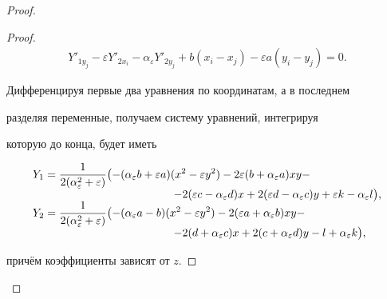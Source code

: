 \begin{proof}
\begin{proof}
\begin{equation*}
\begin{array}{l}
Y'_{1y_j} - \varepsilon Y'_{2x_i} - \alpha_{\varepsilon}Y'_{2y_j}

+ b(x_i - x_j) - \varepsilon a(y_i-y_j) = 0.

\end{array}\end{equation*}

Дифференцируя первые два уравнения по координатам, а в последнем

разделяя переменные, получаем систему уравнений, интегрируя

которую до конца, будет иметь

\begin{equation}

\label{kyrov:3.14}

\begin{array}{l}

\displaystyle

Y_1  = \frac{1}{2(\alpha_{\varepsilon}^2 + \varepsilon)}

\bigl(-(\alpha_{\varepsilon}b+\varepsilon a)(x^2 -

\varepsilon y^2) - 2\varepsilon(b+\alpha_{\varepsilon}a)xy

-\\

\hspace{4.45cm}

-2(\varepsilon c - \alpha_{\varepsilon}d)x  + 2(\varepsilon d -

\alpha_{\varepsilon}c)y + \varepsilon k - \alpha_{\varepsilon}l\bigr),

\\ 

\displaystyle

Y_2  = \frac{1}{2(\alpha_{\varepsilon}^2 +

\varepsilon)} \bigl(-(\alpha_{\varepsilon}a - b)(x^2 - \varepsilon y^2)

- 2(\varepsilon a+\alpha_{\varepsilon}b)xy-\\ 

\hspace{4.45cm}

-2(d +

\alpha_{\varepsilon}c)x + 2(c + \alpha_{\varepsilon}d)y - l +

\alpha_{\varepsilon}k\bigr),

\end{array}

\end{equation}

причём коэффициенты зависят от $z$. 


\end{proof}
\end{proof}
